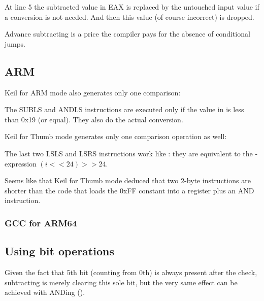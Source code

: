 At line 5 the subtracted value in EAX is replaced by the untouched input value if a conversion is not needed.
And then this value (of course incorrect) is dropped.

Advance subtracting is a price the compiler pays for the absence of conditional jumps.

\subsection{ARM}

\Optimizing Keil for ARM mode also generates only one comparison:



The SUBLS and ANDLS instructions are executed only if the value in  is less than 0x19 (or equal).
They also do the actual conversion.

\Optimizing Keil for Thumb mode generates only one comparison operation as well:



The last two LSLS and LSRS instructions work like :
they are equivalent to the \CCpp-expression $(i<<24)>>24$.

Seems like that Keil for Thumb mode deduced that two 2-byte instructions are shorter than the code 
that loads the 0xFF constant into a register plus an AND instruction.

\subsubsection{GCC for ARM64}





\subsection{Using bit operations}
\label{toupper_bit}

Given the fact that 5th bit (counting from 0th) is always present after the check, subtracting is merely clearing
this sole bit, but the very same effect can be achieved with ANDing ().

